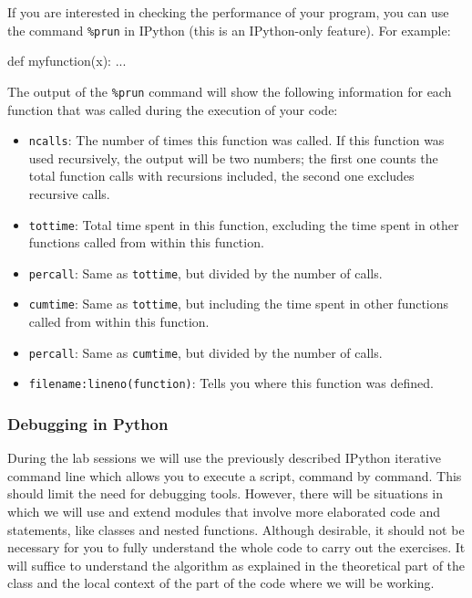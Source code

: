 If you are interested in checking the performance of your program, you can use the command \texttt{\%prun} in IPython (this is an IPython-only feature). For example:

\begin{python}
def myfunction(x):
    ...

\end{python}

The output of the \texttt{\%prun} command will show the following information for each function that was called during the execution of your code:

\begin{itemize}
\item \texttt{ncalls}: The number of times this function was called. If this function was used recursively, the output will be two numbers; the first one counts the total function calls with recursions included, the second one excludes recursive calls.
\item \texttt{tottime}: Total time spent in this function, excluding the time spent in other functions called from within this function.
\item \texttt{percall}: Same as \texttt{tottime}, but divided by the number of calls.
\item \texttt{cumtime}: Same as \texttt{tottime}, but including the time spent in other functions called from within this function.
\item \texttt{percall}: Same as \texttt{cumtime}, but divided by the number of calls.
\item \texttt{filename:lineno(function)}: Tells you where this function was defined.
\end{itemize}

\subsubsection{Debugging in Python}

During the lab sessions we will use the previously described IPython iterative command line which allows you to execute a script, command by command. This should limit the need for debugging tools. However, there will be situations in which we will use and extend modules that involve more elaborated code and statements, like classes and nested functions. Although desirable, it should not be necessary for you to fully understand the whole code to carry out the exercises. It will suffice to understand the algorithm as explained in the theoretical part of the class and the local context of the part of the code where we will be working. 

